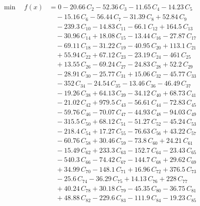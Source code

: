 \documentclass[a4paper,11pt]{article}
\begin{document}
\begin{align}
\min\quad f(x) &= 0 - 20.66\,C_{2} - 52.36\,C_{3} - 11.65\,C_{4} - 14.23\,C_{5} \nonumber\\
&\quad - 15.16\,C_{6} - 56.44\,C_{7} - 31.39\,C_{8} + 52.84\,C_{9} \nonumber\\
&\quad - 239.3\,C_{10} - 14.83\,C_{11} - 66.1\,C_{12} + 164.5\,C_{13} \nonumber\\
&\quad - 30.96\,C_{14} + 18.08\,C_{15} - 13.44\,C_{16} - 27.87\,C_{17} \nonumber\\
&\quad - 69.11\,C_{18} - 31.22\,C_{19} - 40.95\,C_{20} + 113.1\,C_{21} \nonumber\\
&\quad + 55.94\,C_{22} + 67.12\,C_{23} - 23.19\,C_{24} - 461\,C_{25} \nonumber\\
&\quad + 13.55\,C_{26} - 69.24\,C_{27} - 24.83\,C_{28} + 52.2\,C_{29} \nonumber\\
&\quad - 28.91\,C_{30} - 25.77\,C_{31} + 15.06\,C_{32} - 45.77\,C_{33} \nonumber\\
&\quad - 352\,C_{34} - 24.54\,C_{35} - 13.46\,C_{36} - 46.49\,C_{37} \nonumber\\
&\quad - 19.26\,C_{38} + 64.13\,C_{39} - 34.12\,C_{40} + 68.73\,C_{41} \nonumber\\
&\quad - 21.02\,C_{42} + 979.5\,C_{43} - 56.61\,C_{44} - 72.83\,C_{45} \nonumber\\
&\quad - 59.76\,C_{46} - 70.07\,C_{47} - 44.93\,C_{48} - 94.03\,C_{49} \nonumber\\
&\quad - 315.5\,C_{50} + 68.12\,C_{51} - 51.27\,C_{52} - 45.24\,C_{53} \nonumber\\
&\quad - 218.4\,C_{54} + 17.27\,C_{55} - 76.63\,C_{56} + 43.22\,C_{57} \nonumber\\
&\quad - 60.76\,C_{58} + 30.46\,C_{59} - 73.8\,C_{60} + 24.21\,C_{61} \nonumber\\
&\quad - 15.49\,C_{62} + 233.3\,C_{63} - 152.7\,C_{64} - 23.43\,C_{65} \nonumber\\
&\quad - 540.3\,C_{66} - 74.42\,C_{67} - 144.7\,C_{68} + 29.62\,C_{69} \nonumber\\
&\quad + 34.99\,C_{70} - 148.1\,C_{71} + 16.96\,C_{72} + 376.5\,C_{73} \nonumber\\
&\quad - 25.6\,C_{74} - 36.29\,C_{75} + 14.13\,C_{76} + 228\,C_{77} \nonumber\\
&\quad + 40.24\,C_{78} + 30.18\,C_{79} - 45.35\,C_{80} - 36.75\,C_{81} \nonumber\\
&\quad + 48.88\,C_{82} - 229.6\,C_{83} - 111.9\,C_{84} - 19.23\,C_{85} \nonumber\\

\end{align}
\end{document}
